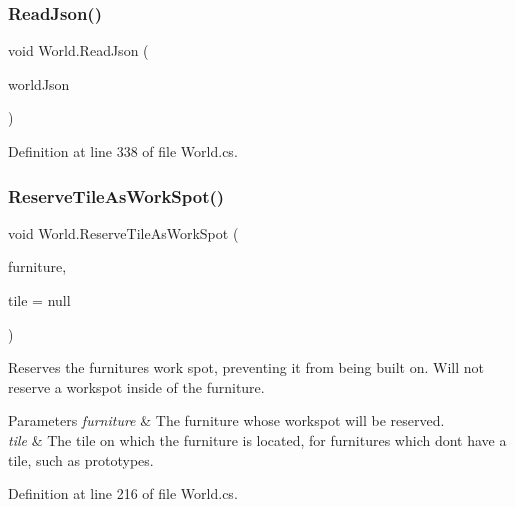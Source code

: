 \subsubsection{\texorpdfstring{Read\+Json()}{ReadJson()}\hspace{0.1cm}{\footnotesize\ttfamily [2/2]}}
{\footnotesize\ttfamily void World.\+Read\+Json (\begin{DoxyParamCaption}\item[{J\+Object}]{world\+Json }\end{DoxyParamCaption})}



Definition at line 338 of file World.\+cs.

\mbox{\label{class_world_afa0c55901cb90c6876f7e1b3b08e7aa5}} 
\subsubsection{\texorpdfstring{Reserve\+Tile\+As\+Work\+Spot()}{ReserveTileAsWorkSpot()}}
{\footnotesize\ttfamily void World.\+Reserve\+Tile\+As\+Work\+Spot (\begin{DoxyParamCaption}\item[{\hyperlink{class_furniture}{Furniture}}]{furniture,  }\item[{\hyperlink{class_tile}{Tile}}]{tile = {\ttfamily null} }\end{DoxyParamCaption})}



Reserves the furniture\textquotesingle{}s work spot, preventing it from being built on. Will not reserve a workspot inside of the furniture. 


\begin{DoxyParams}{Parameters}
{\em furniture} & The furniture whose workspot will be reserved.\\
\hline
{\em tile} & The tile on which the furniture is located, for furnitures which don\textquotesingle{}t have a tile, such as prototypes.\\
\hline
\end{DoxyParams}


Definition at line 216 of file World.\+cs.

\mbox{\label{class_world_a8ec02da60d08dcecd73e55245305aae4}} 
